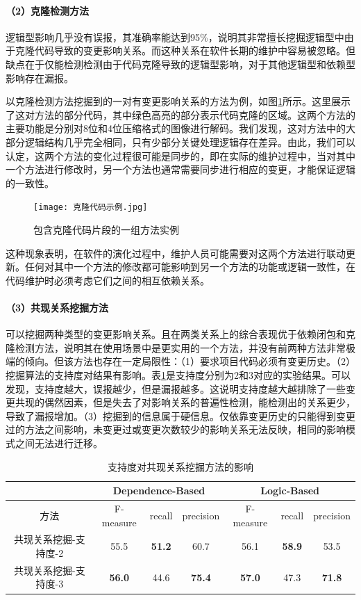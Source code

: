 \paragraph{（2）克隆检测方法} 逻辑型影响几乎没有误报，其准确率能达到95\%，说明其非常擅长挖掘逻辑型中由于克隆代码导致的变更影响关系。而这种关系在软件长期的维护中容易被忽略。但缺点在于仅能检测检测由于代码克隆导致的逻辑型影响，对于其他逻辑型和依赖型影响存在漏报。
    
以克隆检测方法挖掘到的一对有变更影响关系的方法为例，如图\ref{1_包含克隆代码片段的一组方法实例}所示。这里展示了这对方法的部分代码，其中绿色高亮的部分表示代码克隆的区域。这两个方法的主要功能是分别对8位和4位压缩格式的图像进行解码。我们发现，这对方法中的大部分逻辑结构几乎完全相同，只有少部分关键处理逻辑存在差异。由此，我们可以认定，这两个方法的变化过程很可能是同步的，即在实际的维护过程中，当对其中一个方法进行修改时，另一个方法也通常需要同步进行相应的变更，才能保证逻辑的一致性。

\begin{figure}[h]
\centering
\texttt{[image: 克隆代码示例.jpg]}
\caption{包含克隆代码片段的一组方法实例}
\label{1_包含克隆代码片段的一组方法实例}
\end{figure}

这种现象表明，在软件的演化过程中，维护人员可能需要对这两个方法进行联动更新。任何对其中一个方法的修改都可能影响到另一个方法的功能或逻辑一致性，在代码维护时必须考虑它们之间的相互依赖关系。

\paragraph{（3）共现关系挖掘方法} 可以挖掘两种类型的变更影响关系。且在两类关系上的综合表现优于依赖闭包和克隆检测方法，说明其在使用场景中是更实用的一个方法，并没有前两种方法非常极端的倾向。但该方法也存在一定局限性：（1）要求项目代码必须有变更历史。（2）挖掘算法的支持度对结果有影响。表\ref{1_支持度对共现关系挖掘方法的影响}是支持度分别为2和3对应的实验结果。可以发现，支持度越大，误报越少，但是漏报越多。这说明支持度越大越排除了一些变更共现的偶然因素，但是失去了对影响关系的普遍性检测，能检测出的关系更少，导致了漏报增加。（3）挖掘到的信息属于硬信息。仅依靠变更历史的只能得到变更过的方法之间影响，未变更过或变更次数较少的影响关系无法反映，相同的影响模式之间无法进行迁移。
        
\begin{table}[htbp]
\caption{支持度对共现关系挖掘方法的影响}
\label{1_支持度对共现关系挖掘方法的影响}
\vspace{0.5em}\centering\wuhao
\begin{tabular}{c|ccc|ccc}
\toprule
  & \multicolumn{3}{c|}{Dependence-Based} & \multicolumn{3}{c}{Logic-Based}  \\
\midrule
方法 & F-measure & recall & precision & F-measure & recall & precision  \\
\midrule
共现关系挖掘-支持度-2 & 55.5 & \textbf{51.2} & 60.7 & 56.1 & \textbf{58.9} & 53.5 \\
共现关系挖掘-支持度-3 & \textbf{56.0} & 44.6 & \textbf{75.4} & \textbf{57.0} & 47.3 & \textbf{71.8} \\
\bottomrule
\end{tabular}
\end{table}
   
